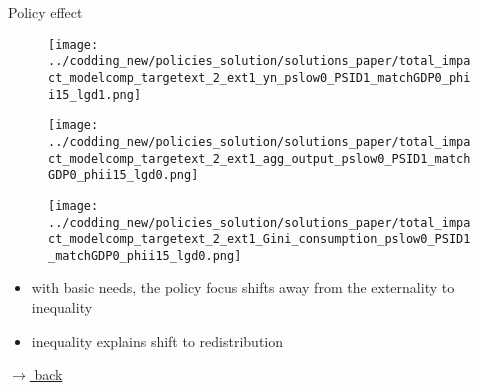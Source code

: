 \documentclass[11pt,aspectratio=169]{beamer}
\begin{document}
	
	\begin{frame}{Policy effect}
		\hypertarget{backpol}{}
		\begin{figure}
			\begin{minipage}[]{0.32\textwidth}
				\texttt{[image: ../codding\_new/policies\_solution/solutions\_paper/total\_impact\_modelcomp\_targetext\_2\_ext1\_yn\_pslow0\_PSID1\_matchGDP0\_phii15\_lgd1.png]}	
			\end{minipage}
			\begin{minipage}[]{0.32\textwidth}
				\texttt{[image: ../codding\_new/policies\_solution/solutions\_paper/total\_impact\_modelcomp\_targetext\_2\_ext1\_agg\_output\_pslow0\_PSID1\_matchGDP0\_phii15\_lgd0.png]}	
			\end{minipage}
			\begin{minipage}[]{0.32\textwidth}
				\texttt{[image: ../codding\_new/policies\_solution/solutions\_paper/total\_impact\_modelcomp\_targetext\_2\_ext1\_Gini\_consumption\_pslow0\_PSID1\_matchGDP0\_phii15\_lgd0.png]}
			\end{minipage}
			
		\end{figure}
		\vspace{4mm}
		\begin{itemize}
			\item with basic needs, the policy focus shifts away from the externality to inequality
			\vspace{2mm}
			\item inequality explains shift to redistribution
		\end{itemize}
		\vspace{9mm}
		\hfill
		\hyperlink{backeff}{\tiny{$\rightarrow$ back}}
	\end{frame}
	
\end{document}
